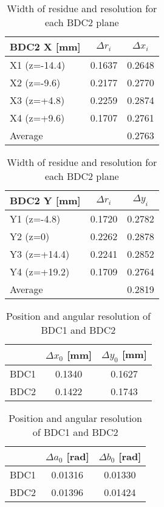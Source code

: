 \begin{table}[h]
    \centering
    \begin{tabular}{l|cc}
    \hline
    BDC2 X [mm]& $\Delta r_i$ & $\Delta x_i$     \\
    \hline
    X1 (z=-14.4)&  0.1637 & 0.2648      \\
    X2 (z=-9.6) &  0.2177 & 0.2770      \\
    X3 (z=+4.8) &  0.2259 & 0.2874      \\
    X4 (z=+9.6) &  0.1707 & 0.2761      \\
    \hline
        Average &         & 0.2763 \\
    \hline
    \end{tabular}
    \begin{tabular}{l|cc}
    \hline
     BDC2 Y [mm] & $\Delta r_i$ & $\Delta y_i$ \\
    \hline
         Y1 (z=-4.8)  & 0.1720 & 0.2782 \\
         Y2 (z=0)     & 0.2262 & 0.2878 \\
         Y3 (z=+14.4) & 0.2241 & 0.2852 \\
         Y4 (z=+19.2) & 0.1709 & 0.2764 \\
    \hline
         Average      &        & 0.2819 \\
    \hline
    \end{tabular}
    \caption{Width of residue and resolution for each BDC2 plane}
\end{table}

\begin{table}[h]
    \centering
    \begin{tabular}{c|cc}
        \hline
                &  $\Delta x_0$ [mm] & $\Delta y_0$ [mm]\\
            \hline
            BDC1 & 0.1340 & 0.1627\\
            BDC2 & 0.1422 & 0.1743\\
            \hline
    \end{tabular}
    \begin{tabular}{c|cc}
    \hline
        & $\Delta a_0$ [rad] & $\Delta b_0$ [rad] \\
        \hline
        BDC1 & 0.01316 & 0.01330 \\
        BDC2 & 0.01396 & 0.01424 \\
        \hline
    \end{tabular}
    \caption{Position and angular resolution of BDC1 and BDC2}
\end{table}

